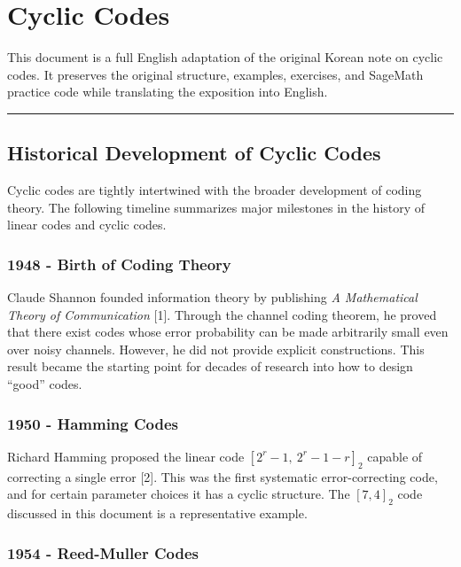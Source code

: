 \documentclass[
]{article}
\author{}
\date{}
\begin{document}
{
\setcounter{tocdepth}{3}
\tableofcontents
}
\section{Cyclic Codes}\label{cyclic-codes}

This document is a full English adaptation of the original Korean note
on cyclic codes. It preserves the original structure, examples,
exercises, and SageMath practice code while translating the exposition
into English.

\begin{center}\rule{0.5\linewidth}{0.5pt}\end{center}

\subsection{Historical Development of Cyclic
Codes}\label{historical-development-of-cyclic-codes}

Cyclic codes are tightly intertwined with the broader development of
coding theory. The following timeline summarizes major milestones in the
history of linear codes and cyclic codes.

\subsubsection{1948 - Birth of Coding
Theory}\label{birth-of-coding-theory}

Claude Shannon founded information theory by publishing \emph{A
Mathematical Theory of Communication} {[}1{]}. Through the channel
coding theorem, he proved that there exist codes whose error probability
can be made arbitrarily small even over noisy channels. However, he did
not provide explicit constructions. This result became the starting
point for decades of research into how to design ``good'' codes.

\subsubsection{1950 - Hamming Codes}\label{hamming-codes}

Richard Hamming proposed the linear code \([2^r - 1,\ 2^r - 1 - r]_2\)
capable of correcting a single error {[}2{]}. This was the first
systematic error-correcting code, and for certain parameter choices it
has a cyclic structure. The \([7,4]_2\) code discussed in this document
is a representative example.

\subsubsection{1954 - Reed-Muller Codes}\label{reed-muller-codes}
\end{document}
